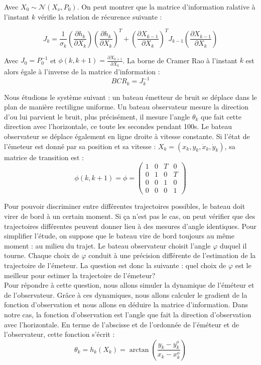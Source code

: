 \documentclass{article}
\begin{document}
Avec $X_{0} \sim  \mathcal{N} (X_{\nu},P_{0})$. On peut montrer que la matrice d'information ralative à l'instant $k$ vérifie
la relation de récurence suivante : 

\[ J_{k} = \frac{1}{\sigma_{k}}\left(\frac{\partial h_{k}}{\partial X_{k}}\right)\left(\frac{\partial h_{k}}{\partial X_{k}}\right)^{T}+\left(\frac{\partial X_{k-1}}{\partial X_{k}}\right)^{T}J_{k-1}\left(\frac{\partial X_{k-1}}{\partial X_{k}}\right)\]

Avec $J_{0}=P_{0}^{-1}$ et $\phi(k,k+1)=\frac{\partial X_{k+1}}{\partial X_{k}}$.
La borne de Cramer Rao à l'instant $k$ est alors égale à l'inverse de la matrice d'information : 
\[BCR_{k}= J_{k}^{-1}\]

Nous étudions le système suivant : un bateau émetteur de bruit se déplace dans le plan de manière rectiligne uniforme. 
Un bateau observateur mesure la direction d'ou lui parvient le bruit, plus précisément, il mesure l'angle $\theta_{k}$ que fait cette direction avec l'horizontale, ce toute les secondes pendant 100s. Le bateau observateur se déplace également en ligne droite à vitesse constante.
Si l'état de l'émeteur est donné par sa position et sa vitesse : $X_{k} = (x_{k},y_{k},\dot{x}_{k},\dot{y}_{k})$, sa matrice de transition est :
\[\phi(k,k+1) = \phi =  \begin{pmatrix}
  1 & 0 & T & 0 \\
  0 & 1 & 0 & T \\
  0 & 0 & 1 & 0 \\
  0 & 0 & 0 & 1 
  \end{pmatrix}\]

Pour pouvoir discriminer entre différentes
trajectoires possibles, le bateau doit virer de bord à un certain moment. Si ça n'est pas le cas, on peut vérifier que des trajectoires différentes peuvent donner lieu à des mesures d'angle identiques.
Pour simplifier l'étude, on suppose que le bateau vire de bord toujours au même moment : au milieu du trajet. Le bateau observateur choisit l'angle $\varphi $ duquel il tourne. Chaque choix de $\varphi$ 
conduit à une précision différente de l'estimation de la trajectoire  de l'émeteur.
La question est donc la suivante : quel choix de $\varphi$ est le meilleur pour estimer la trajectoire de l'émeteur?
\\
Pour répondre à cette question, nous allons simuler la dynamique de l'éméteur et de l'observateur. Grâce à ces dynamiques, nous allons
calculer le gradient de la fonction d'observation et nous allons en déduire la matrice d'information.
Dans notre cas, la fonction d'observation est l'angle que fait la direction d'observation avec l'horizontale. 
En terme de l'abscisse et de l'ordonnée de l'éméteur et de l'observateur, cette fonction s'écrit : 
\[\theta_{k} = h_{k}(X_{k})=\arctan \left(\frac{y_{k}-y_{k}^{o}}{x_{k}-x_{k}^{o}}\right)\]
\end{document}
